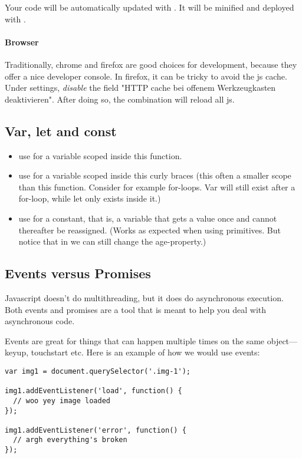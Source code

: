 Your code will be automatically updated with . It will be minified and deployed with .


\paragraph{Browser} Traditionally, chrome and firefox are good choices for development, because they offer a nice developer console. In firefox, it can be tricky to avoid the js cache. Under settings, \emph{disable} the field "HTTP cache bei offenem Werkzeugkasten deaktivieren". After doing so, the combination  will reload all js. 




\subsection{Var, let and const}
\begin{itemize}
    \item use  for a variable scoped inside this function. 
    \item use  for a variable scoped inside this curly braces (this often a smaller scope than this function. Consider for example for-loops. Var will still exist after a for-loop, while let only exists inside it.) 
    \item use  for a constant, that is, a variable that gets a value once and cannot  thereafter be reassigned. (Works as expected when using primitives. But notice that in  we can still change the age-property.)
\end{itemize}


\subsection{Events versus Promises}
Javascript doesn't do multithreading, but it does do asynchronous execution. Both events and promises are a tool that is meant to help you deal with asynchronous code. 

Events are great for things that can happen multiple times on the same object—keyup, touchstart etc. Here is an example of how we would use events: 
\begin{lstlisting}
var img1 = document.querySelector('.img-1');

img1.addEventListener('load', function() {
  // woo yey image loaded
});

img1.addEventListener('error', function() {
  // argh everything's broken
});

\end{lstlisting}

